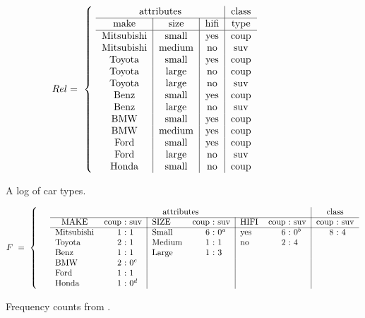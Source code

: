 
\begin{figure}[!b]
\begin{footnotesize}\[
Rel=~\left\{~\begin{tabular}{c|c|c|c}
\multicolumn{3}{c|}{attributes}&class\\\hline
 make &           size&    hifi &type\\\hline
 Mitsubishi  &    small    &  yes  &    coup\\
 Mitsubishi  &    medium   &  no   &    suv\\
 Toyota      &    small    &  yes   &   coup\\
 Toyota      &    large    &  no    &   coup\\
 Toyota      &    large    &  no    &   suv\\
 Benz        &    small    &  yes   &   coup\\
 Benz        &    large    &  no    &   suv\\
 BMW         &    small    &  yes   &   coup\\
 BMW         &    medium   &  yes   &   coup\\
 Ford        &    small    &  yes   &   coup\\
 Ford        &    large    &  no    &   suv\\
 Honda       &    small    &  no     &  coup\\
 \end{tabular}
 \right.
 \]
 \end{footnotesize}
 \caption{A log of car types.}\label{fig:cars}
\end{figure}\begin{figure*}
\begin{footnotesize}\[
F~=~\left\{~\begin{tabular}{rlr@{~:~}l|lr@{~:~}l|lr@{~:~}l|r@{~:~}l}
 \multicolumn{1}{l}{}&\multicolumn{9}{c|}{attributes}& \multicolumn{2}{c}{class}\\\cline{2-12}
\multicolumn{1}{c}{}&    \multicolumn{1}{c}{MAKE}&      coup& suv &
SIZE  &coup&suv   &HIFI & coup&suv
 & coup&suv\\\cline{2-12}
&Mitsubishi& 1& 1   & Small  &  6&$0^a$   &   yes &6&$0^b$   &    8& 4\\
&Toyota    & 2& 1   & Medium &  1&1          &   no &2&4&\multicolumn{2}{l}{}\\
&Benz      & 1& 1   & Large   & 1&3&\multicolumn{3}{l|}{}&\multicolumn{2}{l}{}\\
&BMW       & 2&0$^c$&\multicolumn{3}{l|}{}&\multicolumn{3}{l|}{}&\multicolumn{2}{l}{}\\
&Ford      & 1& 1&\multicolumn{3}{l|}{}&\multicolumn{3}{l|}{}&\multicolumn{2}{l}{}\\
&Honda     & 1&0$^d$&\multicolumn{3}{l|}{}&\multicolumn{3}{l|}{}&\multicolumn{2}{l}{}\\
\end{tabular}
\right. \]
\end{footnotesize}
\caption{Frequency counts from \protect{}.}\label{fig:raw}
\end{figure*}
